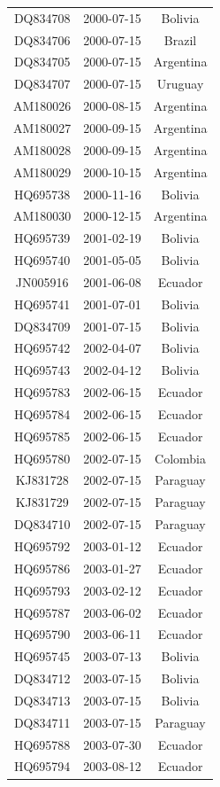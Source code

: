 \documentclass[a4paper,10pt]{article}
\begin{document}
\begin{center}
\begin{longtable}{ccc}
DQ834708 & 2000-07-15 & Bolivia \\
DQ834706 & 2000-07-15 & Brazil \\
DQ834705 & 2000-07-15 & Argentina \\
DQ834707 & 2000-07-15 & Uruguay \\
AM180026 & 2000-08-15 & Argentina \\
AM180027 & 2000-09-15 & Argentina \\
AM180028 & 2000-09-15 & Argentina \\
AM180029 & 2000-10-15 & Argentina \\
HQ695738 & 2000-11-16 & Bolivia \\
AM180030 & 2000-12-15 & Argentina \\
HQ695739 & 2001-02-19 & Bolivia \\
HQ695740 & 2001-05-05 & Bolivia \\
JN005916 & 2001-06-08 & Ecuador \\
HQ695741 & 2001-07-01 & Bolivia \\
DQ834709 & 2001-07-15 & Bolivia \\
HQ695742 & 2002-04-07 & Bolivia \\
HQ695743 & 2002-04-12 & Bolivia \\
HQ695783 & 2002-06-15 & Ecuador \\
HQ695784 & 2002-06-15 & Ecuador \\
HQ695785 & 2002-06-15 & Ecuador \\
HQ695780 & 2002-07-15 & Colombia \\
KJ831728 & 2002-07-15 & Paraguay \\
KJ831729 & 2002-07-15 & Paraguay \\
DQ834710 & 2002-07-15 & Paraguay \\
HQ695792 & 2003-01-12 & Ecuador \\
HQ695786 & 2003-01-27 & Ecuador \\
HQ695793 & 2003-02-12 & Ecuador \\
HQ695787 & 2003-06-02 & Ecuador \\
HQ695790 & 2003-06-11 & Ecuador \\
HQ695745 & 2003-07-13 & Bolivia \\
DQ834712 & 2003-07-15 & Bolivia \\
DQ834713 & 2003-07-15 & Bolivia \\
DQ834711 & 2003-07-15 & Paraguay \\
HQ695788 & 2003-07-30 & Ecuador \\
HQ695794 & 2003-08-12 & Ecuador \\

\end{longtable}
\end{center}
\end{document}
